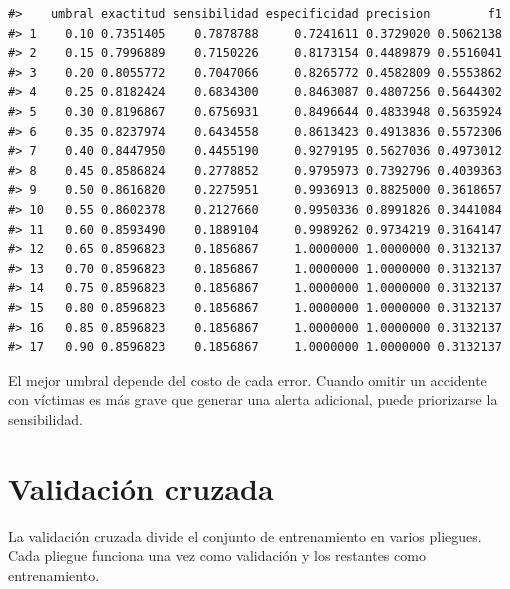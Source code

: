 \documentclass[
  spanish,
  10.5pt,
  letterpaper,
  openany,
  headings=big]{scrbook}
\begin{document}
\begin{verbatim}
#>    umbral exactitud sensibilidad especificidad precision        f1
#> 1    0.10 0.7351405    0.7878788     0.7241611 0.3729020 0.5062138
#> 2    0.15 0.7996889    0.7150226     0.8173154 0.4489879 0.5516041
#> 3    0.20 0.8055772    0.7047066     0.8265772 0.4582809 0.5553862
#> 4    0.25 0.8182424    0.6834300     0.8463087 0.4807256 0.5644302
#> 5    0.30 0.8196867    0.6756931     0.8496644 0.4833948 0.5635924
#> 6    0.35 0.8237974    0.6434558     0.8613423 0.4913836 0.5572306
#> 7    0.40 0.8447950    0.4455190     0.9279195 0.5627036 0.4973012
#> 8    0.45 0.8586824    0.2778852     0.9795973 0.7392796 0.4039363
#> 9    0.50 0.8616820    0.2275951     0.9936913 0.8825000 0.3618657
#> 10   0.55 0.8602378    0.2127660     0.9950336 0.8991826 0.3441084
#> 11   0.60 0.8593490    0.1889104     0.9989262 0.9734219 0.3164147
#> 12   0.65 0.8596823    0.1856867     1.0000000 1.0000000 0.3132137
#> 13   0.70 0.8596823    0.1856867     1.0000000 1.0000000 0.3132137
#> 14   0.75 0.8596823    0.1856867     1.0000000 1.0000000 0.3132137
#> 15   0.80 0.8596823    0.1856867     1.0000000 1.0000000 0.3132137
#> 16   0.85 0.8596823    0.1856867     1.0000000 1.0000000 0.3132137
#> 17   0.90 0.8596823    0.1856867     1.0000000 1.0000000 0.3132137
\end{verbatim}

\begin{tcolorbox}[enhanced jigsaw, arc=.35mm, bottomrule=.15mm, bottomtitle=1mm, breakable, colback=white, colbacktitle=quarto-callout-note-color!10!white, colframe=quarto-callout-note-color-frame, coltitle=black, left=2mm, leftrule=.75mm, opacityback=0, opacitybacktitle=0.6, rightrule=.15mm, title=\textcolor{quarto-callout-note-color}{\faInfo}\hspace{0.5em}{Decisión práctica}, titlerule=0mm, toprule=.15mm, toptitle=1mm]

El mejor umbral depende del costo de cada error. Cuando omitir un
accidente con víctimas es más grave que generar una alerta adicional,
puede priorizarse la sensibilidad.

\end{tcolorbox}

\section{Validación cruzada}\label{validaciuxf3n-cruzada}

La validación cruzada divide el conjunto de entrenamiento en varios
pliegues. Cada pliegue funciona una vez como validación y los restantes
como entrenamiento.
\end{document}
